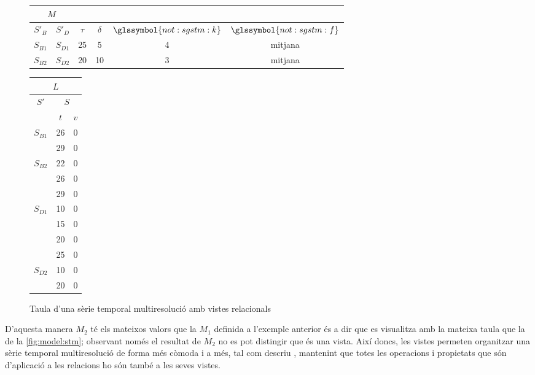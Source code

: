 \begin{example} 
  \begin{figure}[tp]
    \centering
    \begin{tabular}{|c|c|c|c|c|c|}
      \multicolumn{2}{c}{$M$} \\ \hline
      $S'_B$  & $S'_D$ & $\tau$ & $\delta$ & $\glssymbol{not:sgstm:k}$ & $\glssymbol{not:sgstm:f}$ \\ \hline
      $S_{B1}$ & $S_{D1}$ & 25 & 5  & 4 & mitjana  \\
      $S_{B2}$ & $S_{D2}$ & 20 & 10 & 3 & mitjana  \\ \hline
    \end{tabular}\qquad
    \begin{tabular}{|c|c|c|}
      \multicolumn{3}{c}{$L$} \\ \hline
      \multirow{2}{*}{$S'$}  &  \multicolumn{2}{c|}{$S$} \\ \cline{2-3}
      & $t$      & $v$  \\ \hline
      \multirow{2}{*}{$S_{B1}$} 
      & 26 & 0 \\ 
      & 29 & 0 \\ \hline
      \multirow{3}{*}{$S_{B2}$} 
      & 22 & 0 \\ 
      & 26 & 0 \\ 
      & 29 & 0 \\ \hline
      \multirow{4}{*}{$S_{D1}$} 
      & 10 & 0 \\ 
      & 15 & 0 \\ 
      & 20 & 0 \\ 
      & 25 & 0 \\ \hline
      \multirow{2}{*}{$S_{D2}$} 
      & 10 & 0 \\ 
      & 20 & 0 \\ \hline
    \end{tabular}
    \caption{Taula d'una sèrie temporal multiresolució amb vistes
      relacionals}
    \label{fig:model:stm:vistes}
  \end{figure}


  D'aquesta manera $M_2$ té els mateixos valors que la $M_1$ definida
  a l'exemple anterior és a dir que es visualitza amb la mateixa taula
  que la de la \autoref{fig:model:stm}; observant només el resultat de
  $M_2$ no es pot distingir que és una vista. Així doncs, les vistes
  permeten organitzar una sèrie temporal multiresolució de forma més
  còmoda i a més, tal com descriu \textcite{date13}, mantenint que
  totes les operacions i propietats que són d'aplicació a les
  relacions ho són també a les seves vistes.





\end{example}



